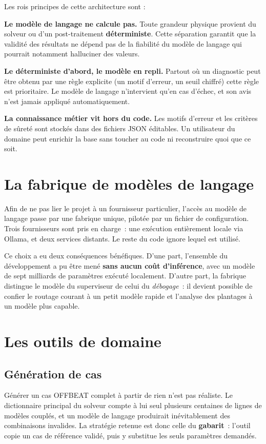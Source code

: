 \documentclass[12pt,a4paper,french]{report}
\begin{document}
Les rois principes de cette architecture sont :

\textbf{Le modèle de langage ne calcule pas.} Toute grandeur physique provient
du solveur ou d'un post-traitement \textbf{déterministe}. Cette séparation garantit que
la validité des résultats ne dépend pas de la fiabilité du modèle de langage qui pourrait notamment halluciner des valeurs.

\textbf{Le déterministe d'abord, le modèle en repli.} Partout où un diagnostic
peut être obtenu par une règle explicite (un motif d'erreur, un seuil chiffré)
cette règle est prioritaire. Le modèle de langage n'intervient qu'en
cas d'échec, et son avis n'est jamais appliqué automatiquement.

\textbf{La connaissance métier vit hors du code.} Les motifs d'erreur et les
critères de sûreté sont stockés dans des fichiers JSON éditables. Un
utilisateur du domaine peut enrichir la base sans toucher au code ni
reconstruire quoi que ce soit.

\section{La fabrique de modèles de langage}

Afin de ne pas lier le projet à un fournisseur particulier, l'accès au modèle
de langage passe par une fabrique unique, pilotée par un fichier de
configuration. Trois fournisseurs sont pris en charge~: une exécution
entièrement locale via Ollama, et deux services distants. Le reste du code
ignore lequel est utilisé.

Ce choix a eu deux conséquences bénéfiques. D'une part, l'ensemble du
développement a pu être mené \textbf{sans aucun coût d'inférence}, avec un
modèle de sept milliards de paramètres exécuté localement. D'autre part, la
fabrique distingue le modèle du superviseur de celui du \textit{débogage}~: il
devient possible de confier le routage courant à un petit modèle rapide et
l'analyse des plantages à un modèle plus capable.

\section{Les outils de domaine}

\subsection{Génération de cas}

Générer un cas OFFBEAT complet à partir de rien n'est pas réaliste. Le
dictionnaire principal du solveur compte à lui seul plusieurs centaines de
lignes de modèles couplés, et un modèle de langage produirait inévitablement des
combinaisons invalides. La stratégie retenue est donc celle du
\textbf{gabarit}~: l'outil copie un cas de référence validé, puis y substitue
les seuls paramètres demandés.
\end{document}
